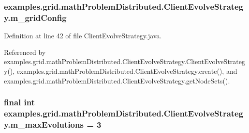 \hypertarget{classexamples_1_1grid_1_1math_problem_distributed_1_1_client_evolve_strategy_a0577ef3c95315bf1e2afe9e74c775861}{
\subsubsection[{m\-\_\-grid\-Config}]{ examples.\-grid.\-math\-Problem\-Distributed.\-Client\-Evolve\-Strategy.\-m\-\_\-grid\-Config\hspace{0.3cm}{\ttfamily [private]}}}\label{classexamples_1_1grid_1_1math_problem_distributed_1_1_client_evolve_strategy_a0577ef3c95315bf1e2afe9e74c775861}


Definition at line 42 of file Client\-Evolve\-Strategy.\-java.



Referenced by examples.\-grid.\-math\-Problem\-Distributed.\-Client\-Evolve\-Strategy.\-Client\-Evolve\-Strategy(), examples.\-grid.\-math\-Problem\-Distributed.\-Client\-Evolve\-Strategy.\-create(), and examples.\-grid.\-math\-Problem\-Distributed.\-Client\-Evolve\-Strategy.\-get\-Node\-Sets().

\hypertarget{classexamples_1_1grid_1_1math_problem_distributed_1_1_client_evolve_strategy_ae9dde44546202496c6ec538cfe89665f}{
\subsubsection[{m\-\_\-max\-Evolutions}]{\setlength{\rightskip}{0pt plus 5cm}final int examples.\-grid.\-math\-Problem\-Distributed.\-Client\-Evolve\-Strategy.\-m\-\_\-max\-Evolutions = 3\hspace{0.3cm}{\ttfamily [private]}}}\label{classexamples_1_1grid_1_1math_problem_distributed_1_1_client_evolve_strategy_ae9dde44546202496c6ec538cfe89665f}


